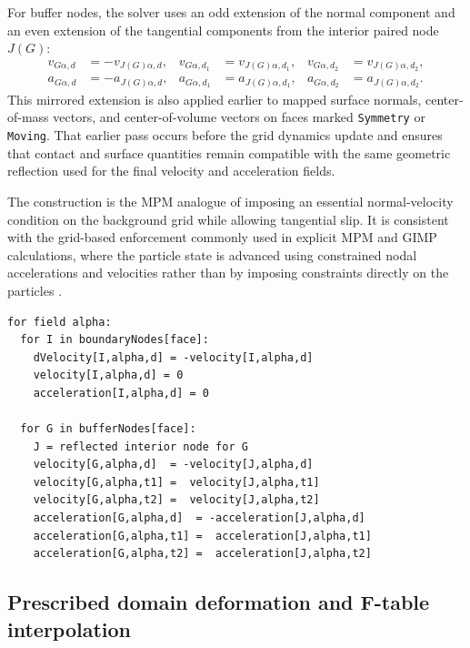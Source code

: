 For buffer nodes, the solver uses an odd extension of the normal component and an even extension of the tangential components from the interior paired node $J(G)$:
\begin{align}
  v_{G\alpha,d}   &= -v_{J(G)\alpha,d}, &
  v_{G\alpha,d_1} &=  v_{J(G)\alpha,d_1}, &
  v_{G\alpha,d_2} &=  v_{J(G)\alpha,d_2},
  \label{eq:bc-symmetry-buffer-velocity} \\
  a_{G\alpha,d}   &= -a_{J(G)\alpha,d}, &
  a_{G\alpha,d_1} &=  a_{J(G)\alpha,d_1}, &
  a_{G\alpha,d_2} &=  a_{J(G)\alpha,d_2}.
\end{align}
This mirrored extension is also applied earlier to mapped surface normals, center-of-mass vectors, and center-of-volume vectors on faces marked \texttt{Symmetry} or \texttt{Moving}.  That earlier pass occurs before the grid dynamics update and ensures that contact and surface quantities remain compatible with the same geometric reflection used for the final velocity and acceleration fields.

The construction is the MPM analogue of imposing an essential normal-velocity condition on the background grid while allowing tangential slip.  It is consistent with the grid-based enforcement commonly used in explicit MPM and GIMP calculations, where the particle state is advanced using constrained nodal accelerations and velocities rather than by imposing constraints directly on the particles \cite{sulsky1994history,bardenhagen2004gimp,wallstedt2008explicit}.

\begin{lstlisting}[caption={Symmetry-face enforcement.}]
for field alpha:
  for I in boundaryNodes[face]:
    dVelocity[I,alpha,d] = -velocity[I,alpha,d]
    velocity[I,alpha,d] = 0
    acceleration[I,alpha,d] = 0

  for G in bufferNodes[face]:
    J = reflected interior node for G
    velocity[G,alpha,d]  = -velocity[J,alpha,d]
    velocity[G,alpha,t1] =  velocity[J,alpha,t1]
    velocity[G,alpha,t2] =  velocity[J,alpha,t2]
    acceleration[G,alpha,d]  = -acceleration[J,alpha,d]
    acceleration[G,alpha,t1] =  acceleration[J,alpha,t1]
    acceleration[G,alpha,t2] =  acceleration[J,alpha,t2]
\end{lstlisting}

\subsection{Prescribed domain deformation and F-table interpolation}
\label{subsec:bc-ftable-internals}

